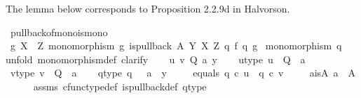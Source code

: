 \begin{isabellebody}
\begin{isamarkuptext}
The lemma below corresponds to Proposition 2.2.9d in Halvorson.%
\end{isamarkuptext}\isamarkuptrue%
\isamarkupfalse%
\ pullback{\isacharunderscore}{\kern0pt}of{\isacharunderscore}{\kern0pt}mono{\isacharunderscore}{\kern0pt}is{\isacharunderscore}{\kern0pt}mono{}{\isacharcolon}{\kern0pt}\isanewline
{}\ {\isachardoublequoteopen}g{\isacharcolon}{\kern0pt}\ X\ {\isasymrightarrow}\ Z{\isachardoublequoteclose}\ {\isachardoublequoteopen}monomorphism\ g{\isachardoublequoteclose}\ {\isachardoublequoteopen}is{\isacharunderscore}{\kern0pt}pullback\ A\ Y\ X\ Z\ q{}\ f\ q{}\ g{\isachardoublequoteclose}\isanewline
{}\ {\isachardoublequoteopen}monomorphism\ q{}{\isachardoublequoteclose}\ \isanewline
%
\isadelimproof
%
\endisadelimproof
%
\isatagproof
{}\isamarkupfalse%
{\isacharparenleft}{\kern0pt}unfold\ monomorphism{\isacharunderscore}{\kern0pt}def{}{\isacharcomma}{\kern0pt}\ clarify{\isacharparenright}{\kern0pt}\isanewline
\ \ \isamarkupfalse%
\ u\ v\ Q\ a\ y\isanewline
\ \ \isamarkupfalse%
\ u{\isacharunderscore}{\kern0pt}type{\isacharcolon}{\kern0pt}\ {\isachardoublequoteopen}u\ {\isacharcolon}{\kern0pt}\ Q\ {\isasymrightarrow}\ a{\isachardoublequoteclose}\ \ \isanewline
\ \ \isamarkupfalse%
\ v{\isacharunderscore}{\kern0pt}type{\isacharcolon}{\kern0pt}\ {\isachardoublequoteopen}v\ {\isacharcolon}{\kern0pt}\ Q\ {\isasymrightarrow}\ a{\isachardoublequoteclose}\isanewline
\ \ \isamarkupfalse%
\ q{}{\isacharunderscore}{\kern0pt}type{\isacharcolon}{\kern0pt}\ {\isachardoublequoteopen}q{}\ {\isacharcolon}{\kern0pt}\ \ a\ {\isasymrightarrow}\ y{\isachardoublequoteclose}\ \isanewline
\ \ \isamarkupfalse%
\ equals{\isacharcolon}{\kern0pt}\ {\isachardoublequoteopen}q{}\ {\isasymcirc}\isactrlsub c\ u\ {\isacharequal}{\kern0pt}\ q{}\ {\isasymcirc}\isactrlsub c\ v{\isachardoublequoteclose}\ \isanewline
\isanewline
\ \ \isamarkupfalse%
\ a{\isacharunderscore}{\kern0pt}is{\isacharunderscore}{\kern0pt}A{\isacharcolon}{\kern0pt}\ {\isachardoublequoteopen}a\ {\isacharequal}{\kern0pt}\ A{\isachardoublequoteclose}\isanewline
\ \ \ \ \isamarkupfalse%
\ assms{\isacharparenleft}{\kern0pt}{}{\isacharparenright}{\kern0pt}\ cfunc{\isacharunderscore}{\kern0pt}type{\isacharunderscore}{\kern0pt}def\ is{\isacharunderscore}{\kern0pt}pullback{\isacharunderscore}{\kern0pt}def\ q{}{\isacharunderscore}{\kern0pt}type\ \ \isamarkupfalse%

\end{isabellebody}
